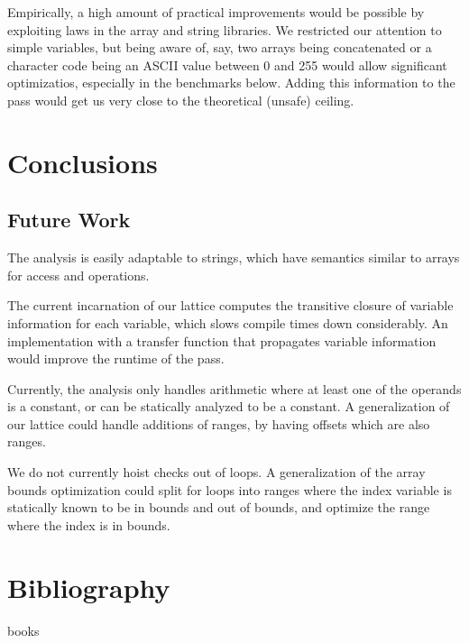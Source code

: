 \documentclass[11pt]{article}
\begin{document}
Empirically, a high amount of practical improvements would be possible by exploiting laws in the array and string libraries. We restricted our attention to simple variables, but being aware of, say, two arrays being concatenated or a character code being an ASCII value between 0 and 255 would allow significant optimizatios, especially in the benchmarks below. Adding this information to the pass would get us very close to the theoretical (unsafe) ceiling.

\section{Conclusions}



\subsection{Future Work}

The analysis is easily adaptable to strings, which have semantics similar to
arrays for access and operations. 

The current incarnation of our lattice computes the transitive closure of
variable information for each variable, which slows compile times down considerably.
An implementation with a transfer function that propagates variable information would
improve the runtime of the pass.

Currently, the analysis only handles arithmetic where at least one of the operands is
a constant, or can be statically analyzed to be a constant. A generalization of our
lattice could handle additions of ranges, by having offsets which are also ranges.

We do not currently hoist checks out of loops. A generalization of the array bounds optimization
could split for loops into ranges where the index variable is statically known to be in bounds and
out of bounds, and optimize the range where the index is in bounds.

\section{Bibliography}

books
\end{document}
